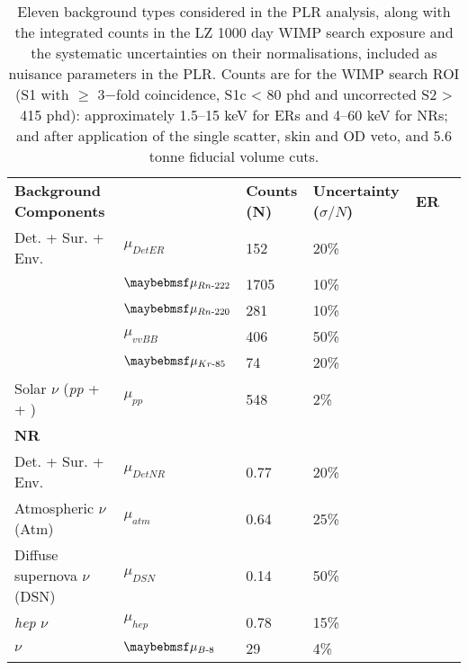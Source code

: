 \begin{table}[t!]
\centering
\caption{Eleven background types considered in the PLR analysis, along with the integrated counts in the LZ 1000 day WIMP search exposure and the systematic uncertainties on their normalisations, included as nuisance parameters in the PLR. Counts are for the WIMP search ROI (S1 with $\geq$ 3−fold coincidence, S1c < 80 phd and uncorrected S2 > 415 phd): approximately 1.5–15 keV for ERs and 4–60 keV for NRs; and after application of the single scatter, skin and OD veto, and 5.6 tonne fiducial volume cuts.}
\label{tab:lz_pdf_estimations}
\vspace{1mm}
\renewcommand{\arraystretch}{1.2}
    \begin{tabularx}{0.9\linewidth}{@{\extracolsep{\fill}}llll}
    \toprule
    \textbf{Background Components} & %
    \textbf{} & %
    \textbf{Counts (N)} & %
    \textbf{Uncertainty ($\sigma/N$)} & %
    \hline
    \hline
    \textbf{ER}    &      &      \\
    Det. + Sur. + Env. & $\mu_{DetER}$ & 152 & 20\% \\
    \RnTTT{} & $\mu_{Rn\MathText{-}222}$ & 1705 & 10\% \\
    \RnTTZ{} & $\mu_{Rn\MathText{-}220}$ & 281 & 10\% \\
    \XeOTS{} \neutrinolessDoubleBeta{} & $\mu_{vvBB}$ & 406 & 50\% \\
    \KrEF{} & $\mu_{Kr\MathText{-}85}$ & 74 & 20\% \\
    Solar $\nu$ (\textit{pp} + \BeS{} + \NOT{}) & $\mu_{pp}$ & 548 & 2\% \\
    \textbf{NR}    &      &      \\
    Det. + Sur. + Env. & $\mu_{DetNR}$ & 0.77 & 20\% \\
    Atmospheric $\nu$ (Atm)  & $\mu_{atm}$ & 0.64 & 25\% \\
    Diffuse supernova $\nu$ (DSN) & $\mu_{DSN}$ & 0.14 & 50\% \\
    \textit{hep} $\nu$ & $\mu_{hep}$ & 0.78 & 15\% \\
    \BE{} $\nu$ & $\mu_{B\MathText{-}8}$ & 29 & 4\% \\
    
    \bottomrule
    \end{tabularx}
\end{table}